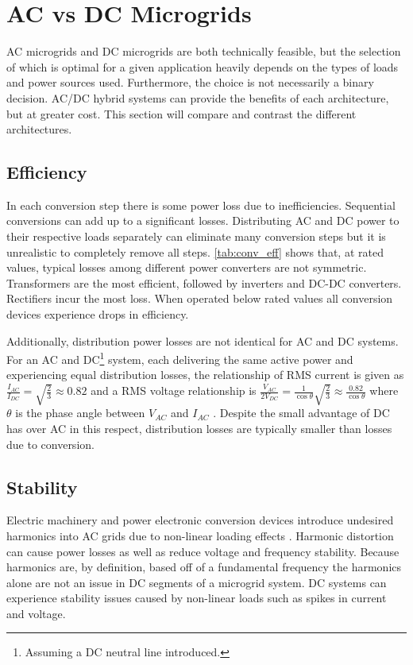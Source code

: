 
\section{AC vs DC Microgrids}
AC microgrids and DC microgrids are both technically feasible, but the selection of which is optimal for a given application heavily depends on the types of loads and power sources used. Furthermore, the choice is not necessarily a binary decision. AC\slash DC hybrid systems can provide the benefits of each architecture, but at greater cost. This section will compare and contrast the different architectures.

\subsection{Efficiency}
In each conversion step there is some power loss due to inefficiencies. Sequential conversions can add up to a significant losses. Distributing AC and DC power to their respective loads separately can eliminate many conversion steps but it is unrealistic to completely remove all steps. \autoref{tab:conv_eff} shows that, at rated values, typical losses among different power converters are not symmetric. Transformers are the most efficient, followed by inverters and DC-DC converters. Rectifiers incur the most loss. When operated below rated values all conversion devices experience drops in efficiency.

 

Additionally, distribution power losses are not identical for AC and DC systems. For an AC and DC\footnote{Assuming a DC neutral line introduced.} system, each delivering the same active power and experiencing equal distribution losses, the relationship of RMS current is given as $\frac{I_{AC}}{I_{DC}} = \sqrt{\frac{2}{3}} \approx 0.82$ and a RMS voltage relationship is $\frac{V_{AC}}{2V_{DC}} = \frac{1}{\cos{\theta}} \sqrt{\frac{2}{3}} \approx \frac{0.82}{\cos{\theta}}$ where $\theta$ is the phase angle between $V_{AC}$ and $I_{AC}$ \cite{Starke2008}. Despite the small advantage of DC has over AC in this respect, distribution losses are typically smaller than losses due to conversion.

\subsection{Stability}
Electric machinery and power electronic conversion devices introduce undesired harmonics into AC grids due to non-linear loading effects \cite{Grotzbach1997}. Harmonic distortion can cause power losses as well as reduce voltage and frequency stability. Because harmonics are, by definition, based off of a fundamental frequency the harmonics alone are not an issue in DC segments of a microgrid system. DC systems can experience stability issues caused by non-linear loads such as spikes in current and voltage.

